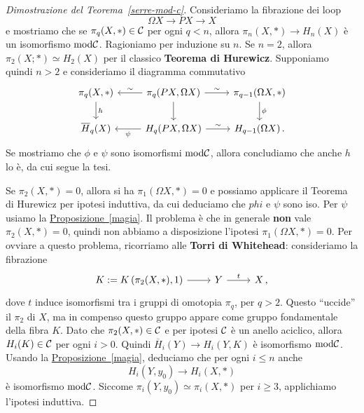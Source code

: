 \begin{proof}[Dimostrazione del Teorema~\ref{serre-mod-c}]
	Consideriamo la fibrazione dei loop
	\begin{equation*}
		\Omega X \longrightarrow PX \longrightarrow X
	\end{equation*}
	e mostriamo che se $\pi_{q}(X,\ast) \in \mathcal{C}$ per ogni $q < n$, 
	allora $\pi_{n}(X,\ast) \to H_{n}(X)$ è un isomorfismo $\mathrm{mod}\mathcal{C}$.
	Ragioniamo per induzione su $n$.
	Se $n=2$, allora $\pi_{2}(X;\ast) \simeq H_{2}(X)$
	per il classico \textbf{Teorema di Hurewicz}.
	Supponiamo quindi $n>2$ e consideriamo il diagramma commutativo
	\begin{equation*}
		\begin{tikzcd}
			\pi_{q}(X,\ast) \ar[d, "h"]
			& \pi_{q}(PX,\Omega X) \ar[l, "\sim"'] \ar[r, "\sim"] \ar[d]
			& \pi_{q-1}(\Omega X, \ast) \ar[d, "\phi"] \\
			\overline{H}_{q}(X) 
			& H_{q}(PX, \Omega X) \ar[l, "\psi"] \ar[r, "\sim"]
			& H_{q-1}(\Omega X)\,.
		\end{tikzcd}
	\end{equation*}
	Se mostriamo che $\phi$ e $\psi$ sono isomorfismi $\mathrm{mod}\mathcal{C}$,
	allora concludiamo che anche $h$ lo è, da cui segue la tesi.
	
	Se $\pi_{2}(X,\ast)=0$, allora si ha $\pi_{1}(\Omega X, \ast) = 0$
	e possiamo applicare il Teorema di Hurewicz per ipotesi induttiva,
	da cui deduciamo che $phi$ e $\psi$ sono iso.
	Per $\psi$ usiamo la \hyperref[magia]{Proposizione~\ref{magia}}.
	Il problema è che in generale \textbf{non} vale $\pi_{2}(X,\ast)=0$,
	quindi non abbiamo a disposizione l'ipotesi $\pi_{1}(\Omega X, \ast)=0$.
	Per ovviare a questo problema, ricorriamo alle \textbf{Torri di Whitehead}:
	consideriamo la fibrazione
	\begin{equation*}
		\begin{tikzcd}
			K:=K \left(\pi_{2}(X,\ast),1\right) \ar[r]
			& Y \ar[r, "t"] & X\,,
		\end{tikzcd}
	\end{equation*}
	dove $t$ induce isomorfismi tra i gruppi di omotopia $\pi_{q}$, per $q > 2$.
	Questo ``uccide'' il $\pi_{2}$ di $X$, ma in compenso
	questo gruppo appare come gruppo fondamentale della fibra $K$.
	Dato che $\pi_{2}(X,\ast) \in \mathcal{C}$ e per ipotesi $\mathcal{C}$ è un anello aciclico,
	allora $H_{i}(K) \in \mathcal{C}$ per ogni $i>0$.
	Quindi $\overline{H}_{i}(Y) \to H_{i}(Y,K)$ è isomorfismo $\mathrm{mod}\mathcal{C}$.
	Usando la \hyperref[magia]{Proposizione~\ref{magia}}, deduciamo che per ogni $i \le n$
	anche 
	\begin{equation*}
		H_{i}(Y,y_{0}) \longrightarrow H_{i}(X,\ast)
	\end{equation*}
	è isomorfismo $\mathrm{mod}\mathcal{C}$.
	Siccome $\pi_{i}(Y,y_{0}) \simeq \pi_{i}(X,\ast)$ per $i \ge 3$,
	applichiamo l'ipotesi induttiva.
\end{proof}

